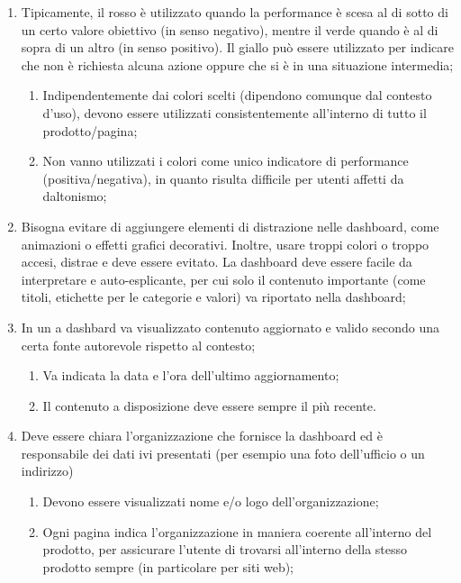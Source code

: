\begin{enumerate}
    \item Tipicamente, il rosso è utilizzato quando la performance è scesa al di sotto di un certo valore obiettivo (in senso negativo), mentre il verde quando è al di sopra di un altro (in senso positivo). Il giallo può essere utilizzato per indicare che non è richiesta alcuna azione oppure che si è in una situazione intermedia;\label{lg:17}
    \begin{enumerate}[label=\alph*.]
        \item Indipendentemente dai colori scelti (dipendono comunque dal contesto d'uso), devono essere utilizzati consistentemente all'interno di tutto il prodotto/pagina;\label{lg:17.a}
        \item Non vanno utilizzati i colori come unico indicatore di performance (positiva/negativa), in quanto risulta difficile per utenti affetti da daltonismo;
    \end{enumerate}
    \item Bisogna evitare di aggiungere elementi di distrazione nelle dashboard, come animazioni o effetti grafici decorativi. Inoltre, usare troppi colori o troppo accesi, distrae e deve essere evitato. La dashboard deve essere facile da interpretare e auto-esplicante, per cui solo il contenuto importante (come titoli, etichette per le categorie e valori) va riportato nella dashboard;\label{lg:18}
    \item In un a dashbard va visualizzato contenuto aggiornato e valido secondo una certa fonte autorevole rispetto al contesto;\label{lg:19}
    \begin{enumerate}[label=\alph*.]
        \item Va indicata la data e l'ora dell'ultimo aggiornamento; \label{lg:19.a}
        \item Il contenuto a disposizione deve essere sempre il più recente.
    \end{enumerate}
    \item Deve essere chiara l'organizzazione che fornisce la dashboard ed è responsabile dei dati ivi presentati (per esempio una foto dell'ufficio o un indirizzo)\label{lg:20}
    \begin{enumerate}[label=\alph*.]
        \item Devono essere visualizzati nome e/o logo dell'organizzazione;
        \item Ogni pagina indica l'organizzazione in maniera coerente all'interno del prodotto, per assicurare l'utente di trovarsi all'interno della stesso prodotto sempre (in particolare per siti web);

\end{enumerate}
\end{enumerate}
